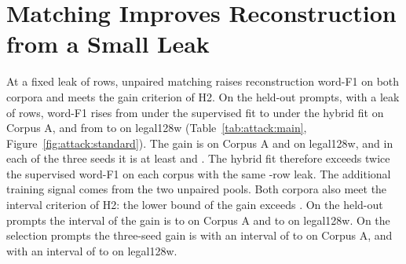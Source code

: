 \section{Matching Improves Reconstruction from a Small Leak}\label{sec:attack:hybrid}

At a fixed leak of  rows, unpaired matching raises reconstruction word-F1 on both corpora and meets the gain criterion of H2.
On the  held-out prompts, with a leak of  rows, word-F1 rises from  under the supervised fit to  under the hybrid fit on Corpus A, and from  to  on legal128w (Table~\ref{tab:attack:main}, Figure~\ref{fig:attack:standard}). %
The gain is  on Corpus A and  on legal128w, and in each of the three seeds it is at least  and . %
The hybrid fit therefore exceeds twice the supervised word-F1 on each corpus with the same -row leak.
The additional training signal comes from the two unpaired pools.
Both corpora also meet the interval criterion of H2: the lower bound of the gain exceeds .
On the held-out prompts the interval of the gain is  to  on Corpus A and  to  on legal128w. %
On the  selection prompts the three-seed gain is  with an interval of  to  on Corpus A, and  with an interval of  to  on legal128w. %

